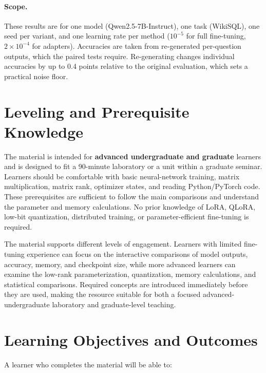 \documentclass{article}
\begin{document}
\paragraph{Scope.} These results are for one model (Qwen2.5-7B-Instruct), one task (WikiSQL), one seed per variant, and one learning rate per method ($10^{-5}$ for full fine-tuning, $2\times10^{-4}$ for adapters). Accuracies are taken from re-generated per-question outputs, which the paired tests require. Re-generating changes individual accuracies by up to 0.4 points relative to the original evaluation, which sets a practical noise floor.
\section{Leveling and Prerequisite Knowledge}
The material is intended for \textbf{advanced undergraduate and graduate} learners and is designed to fit a 90-minute laboratory or a unit within a graduate seminar. Learners should be comfortable with basic neural-network training, matrix multiplication, matrix rank, optimizer states, and reading Python/PyTorch code. These prerequisites are sufficient to follow the main comparisons and understand the parameter and memory calculations. No prior knowledge of LoRA, QLoRA, low-bit quantization, distributed training, or parameter-efficient fine-tuning is required.

The material supports different levels of engagement. Learners with limited fine-tuning experience can focus on the interactive comparisons of model outputs, accuracy, memory, and checkpoint size, while more advanced learners can examine the low-rank parameterization, quantization, memory calculations, and statistical comparisons. Required concepts are introduced immediately before they are used, making the resource suitable for both a focused advanced-undergraduate laboratory and graduate-level teaching.

\section{Learning Objectives and Outcomes}

A learner who completes the material will be able to:
\end{document}
